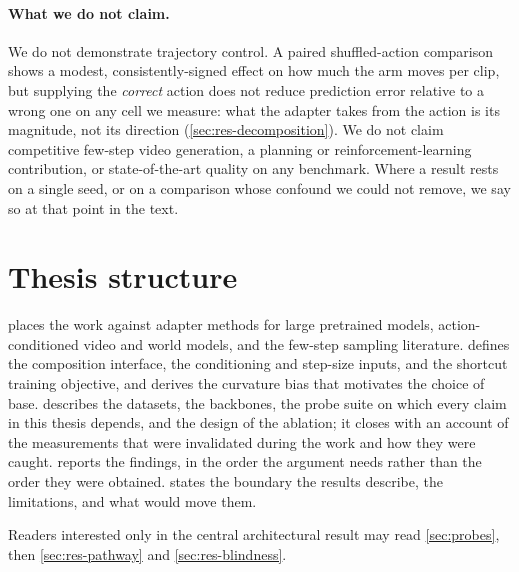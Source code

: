 \paragraph{What we do not claim.} We do not demonstrate trajectory control.
A paired shuffled-action comparison shows a modest, consistently-signed
effect on how much the arm moves per clip, but supplying the \emph{correct}
action does not reduce prediction error relative to a wrong one on any cell
we measure: what the adapter takes from the action is its magnitude, not its
direction (\cref{sec:res-decomposition}). We do not claim competitive few-step
video generation, a planning or reinforcement-learning contribution, or
state-of-the-art quality on any benchmark. Where a result rests on a single
seed, or on a comparison whose confound we could not remove, we say so at
that point in the text.

\section{Thesis structure}
\label{sec:structure}

 places the work against adapter methods for large
pretrained models, action-conditioned video and world models, and the
few-step sampling literature.  defines the composition
interface, the conditioning and step-size inputs, and the shortcut training
objective, and derives the curvature bias that motivates the choice of base.
 describes the datasets, the backbones, the probe suite
on which every claim in this thesis depends, and the design of the ablation;
it closes with an account of the measurements that were invalidated during
the work and how they were caught.  reports the findings, in
the order the argument needs rather than the order they were obtained.
 states the boundary the results describe, the
limitations, and what would move them.

Readers interested only in the central architectural result may read
\cref{sec:probes}, then \cref{sec:res-pathway} and
\cref{sec:res-blindness}.
